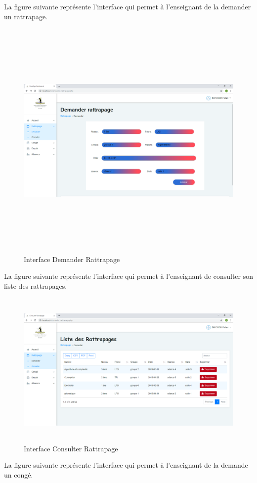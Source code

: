 \documentclass[12 pt]{report}
\begin{document}
La figure suivante représente l'interface qui permet à l'enseignant de la demander un rattrapage.

\begin{figure}[h]
 \begin{center}
\includegraphics[width= 18 cm ,height=  12cm]{demander_rattrapage.PNG}
\caption{Interface Demander Rattrapage}

\end{center}
\end{figure}
\newpage
La figure suivante représente l'interface qui permet à l'enseignant de consulter son liste des  rattrapages.

\begin{figure}[h]
 \begin{center}
\includegraphics[width= 15 cm ,height=  7.7cm]{consulter_rattrapage.PNG}
\caption{Interface Consulter Rattrapage}

\end{center}
\end{figure}
La figure suivante représente l'interface qui permet à l'enseignant de la demande un congé.
\end{document}
